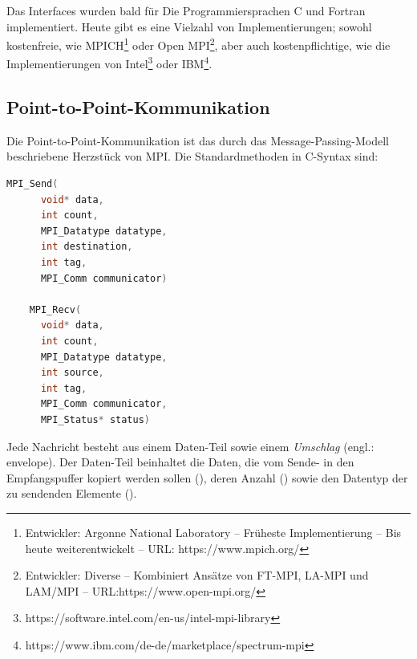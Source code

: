       Das Interfaces wurden bald für Die Programmiersprachen C und Fortran implementiert. Heute gibt es eine Vielzahl von Implementierungen; sowohl kostenfreie, wie  
      MPICH\footnote{Entwickler: Argonne National Laboratory -- Früheste Implementierung -- Bis heute weiterentwickelt -- URL: https://www.mpich.org/} oder
      Open MPI\footnote{Entwickler: Diverse -- Kombiniert Ansätze von FT-MPI, LA-MPI und LAM/MPI -- URL:https://www.open-mpi.org/},
      aber auch kostenpflichtige, wie die Implementierungen von Intel\footnote{https://software.intel.com/en-us/intel-mpi-library} oder IBM\footnote{https://www.ibm.com/de-de/marketplace/spectrum-mpi}. 
      
    \subsection{Point-to-Point-Kommunikation}
    \label{sec:ptpkom}
    Die Point-to-Point-Kommunikation ist das durch das Message-Passing-Modell beschriebene Herzstück von MPI.  
    Die Standardmethoden in C-Syntax sind:
    \begin{lstlisting}[language=C, label=lst:p2p_standard, caption={Die Syntax der standard Sende- und Empfangsoperationen}, numbers=none]
	MPI_Send(
	  void* data,
	  int count,
	  MPI_Datatype datatype,
	  int destination,
	  int tag,
	  MPI_Comm communicator)

	MPI_Recv(
	  void* data,
	  int count,
	  MPI_Datatype datatype,
	  int source,
	  int tag,
	  MPI_Comm communicator,
	  MPI_Status* status)

    \end{lstlisting}
    
    Jede Nachricht besteht aus einem Daten-Teil sowie einem \textit{Umschlag} (engl.: envelope). Der Daten-Teil beinhaltet die Daten, die vom Sende- in den Empfangspuffer kopiert
    werden sollen (), deren Anzahl () sowie den Datentyp der zu sendenden Elemente (). \citep{mpiv31}
    
